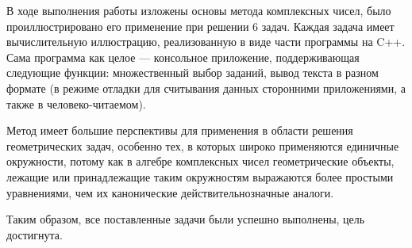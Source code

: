 В ходе выполнения работы изложены основы метода комплексных чисел, было проиллюстрировано его
применение при решении 6 задач. Каждая задача имеет вычислительную иллюстрацию,
реализованную в виде части программы на C++. Сама программа как целое --- консольное приложение,
поддерживающая следующие функции: множественный выбор заданий, вывод текста в разном формате (в режиме
отладки для считывания данных сторонними приложениями, а также в человеко-читаемом).

Метод имеет большие перспективы для применения в области решения геометрических
задач, особенно тех, в которых широко применяются единичные окружности, потому как в алгебре
комплексных чисел геометрические объекты, лежащие или принадлежащие таким окружностям выражаются
более простыми уравнениями, чем их канонические действительнозначные аналоги.

Таким образом, все поставленные задачи были успешно выполнены, цель
достигнута.




